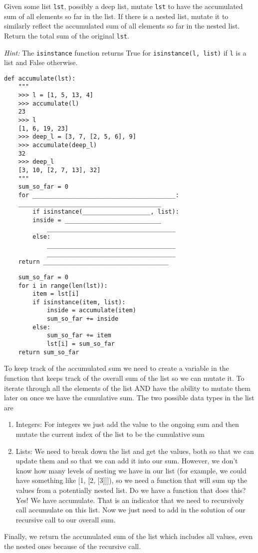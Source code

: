 \question Given some list \texttt{lst}, possibly a deep list, mutate \texttt{lst} to have the accumulated sum of all elements so far in the list. If there is a nested list, mutate it to similarly reflect the accumulated sum of all elements so far in the nested list. Return the total sum of the original \texttt{lst}.

\emph{Hint:} The \lstinline$isinstance$ function returns True for \lstinline$isinstance(l, list)$ if \texttt{l} is a list and False otherwise.

\begin{lstlisting}
def accumulate(lst):
    """
    >>> l = [1, 5, 13, 4]
    >>> accumulate(l)
    23
    >>> l
    [1, 6, 19, 23]
    >>> deep_l = [3, 7, [2, 5, 6], 9]
    >>> accumulate(deep_l)
    32
    >>> deep_l
    [3, 10, [2, 7, 13], 32]
    """
    sum_so_far = 0
    for ________________________________________:
	________________________________________
        if isinstance(___________________, list):
	    inside = ___________________________
            ____________________________________
        else:
            ____________________________________
            ____________________________________
    return ___________________________________
\end{lstlisting}

\begin{solution}[1in]
\begin{lstlisting}
    sum_so_far = 0
    for i in range(len(lst)):
        item = lst[i]
        if isinstance(item, list):
            inside = accumulate(item)
            sum_so_far += inside
        else:
            sum_so_far += item
            lst[i] = sum_so_far
    return sum_so_far
\end{lstlisting}
To keep track of the accumulated sum we need to create a variable in the function that keeps track of the overall sum of the list so we can mutate it. To iterate through all the elements of the list AND have the ability to mutate them later on once we have the cumulative sum. 
The two possible data types in the list are 
\begin{enumerate}
\item Integers:  For integers we just add the value to the ongoing sum and then mutate the current index of the list to be the cumulative sum
\item Lists: We need to break down the list and get the values, both so that we can update them and so that we can add it into our sum.  However, we don’t know how many levels of nesting we have in our list (for example, we could have something like [1, [2, [3]]]), so we need a function that will sum up the values from a potentially nested list.  Do we have a function that does this?  Yes!  We have accumulate.  That is an indicator that we need to recursively call accumulate on this list.  Now we just need to add in the solution of our recursive call to our overall sum.
\end{enumerate}
Finally, we return the accumulated sum of the list which includes all values, even the nested ones because of the recursive call. 

\end{solution}
